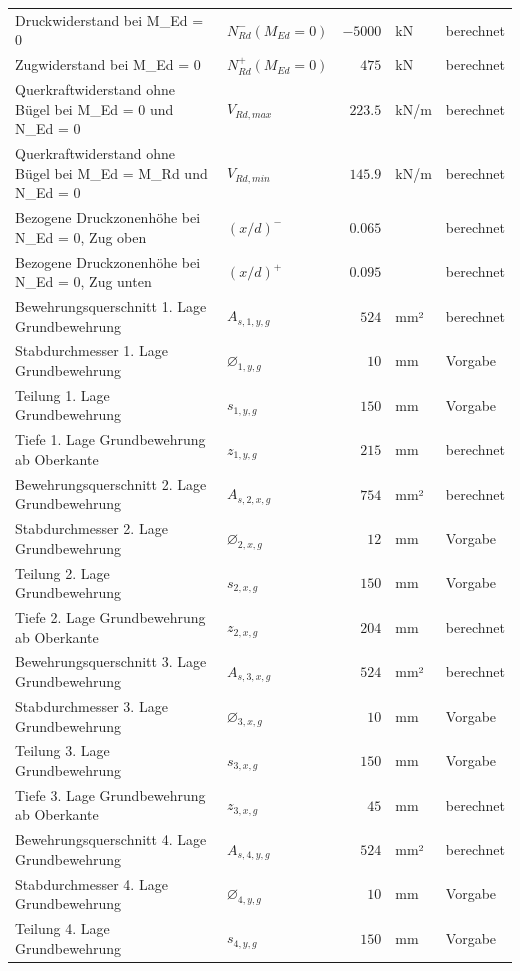 \documentclass[11pt,a4paper]{article}
\begin{document}
\begin{xltabular}{\linewidth}{>{\raggedright\arraybackslash}Xlrll}
Druckwiderstand bei M\_Ed = 0 & $N_{Rd}^{-}(M_{Ed} = 0)$ & $-5000$ & kN & berechnet \\
Zugwiderstand bei M\_Ed = 0 & $N_{Rd}^{+}(M_{Ed} = 0)$ & $475$ & kN & berechnet \\
Querkraftwiderstand ohne Bügel bei M\_Ed = 0 und N\_Ed = 0 & $V_{Rd,max}$ & $223.5$ & kN/m & berechnet \\
Querkraftwiderstand ohne Bügel bei M\_Ed = M\_Rd und N\_Ed = 0 & $V_{Rd,min}$ & $145.9$ & kN/m & berechnet \\
Bezogene Druckzonenhöhe bei N\_Ed = 0, Zug oben & $\left(x/d\right)^{-}$ & $0.065$ &  & berechnet \\
Bezogene Druckzonenhöhe bei N\_Ed = 0, Zug unten & $\left(x/d\right)^{+}$ & $0.095$ &  & berechnet \\
Bewehrungsquerschnitt 1. Lage Grundbewehrung & $A_{s,1,y,g}$ & $524$ & mm² & berechnet \\
Stabdurchmesser 1. Lage Grundbewehrung & $\varnothing_{1,y,g}$ & $10$ & mm & Vorgabe \\
Teilung 1. Lage Grundbewehrung & $s_{1,y,g}$ & $150$ & mm & Vorgabe \\
Tiefe 1. Lage Grundbewehrung ab Oberkante & $z_{1,y,g}$ & $215$ & mm & berechnet \\
Bewehrungsquerschnitt 2. Lage Grundbewehrung & $A_{s,2,x,g}$ & $754$ & mm² & berechnet \\
Stabdurchmesser 2. Lage Grundbewehrung & $\varnothing_{2,x,g}$ & $12$ & mm & Vorgabe \\
Teilung 2. Lage Grundbewehrung & $s_{2,x,g}$ & $150$ & mm & Vorgabe \\
Tiefe 2. Lage Grundbewehrung ab Oberkante & $z_{2,x,g}$ & $204$ & mm & berechnet \\
Bewehrungsquerschnitt 3. Lage Grundbewehrung & $A_{s,3,x,g}$ & $524$ & mm² & berechnet \\
Stabdurchmesser 3. Lage Grundbewehrung & $\varnothing_{3,x,g}$ & $10$ & mm & Vorgabe \\
Teilung 3. Lage Grundbewehrung & $s_{3,x,g}$ & $150$ & mm & Vorgabe \\
Tiefe 3. Lage Grundbewehrung ab Oberkante & $z_{3,x,g}$ & $45$ & mm & berechnet \\
Bewehrungsquerschnitt 4. Lage Grundbewehrung & $A_{s,4,y,g}$ & $524$ & mm² & berechnet \\
Stabdurchmesser 4. Lage Grundbewehrung & $\varnothing_{4,y,g}$ & $10$ & mm & Vorgabe \\
Teilung 4. Lage Grundbewehrung & $s_{4,y,g}$ & $150$ & mm & Vorgabe \\

\end{xltabular}
\end{document}
